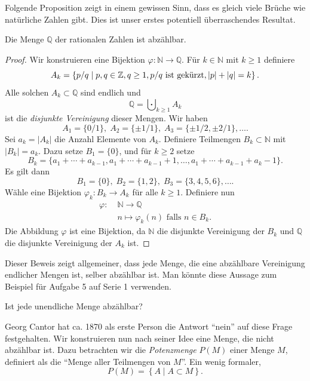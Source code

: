 \documentclass[../main.tex]{subfiles}
\begin{document}
Folgende Proposition zeigt in einem gewissen Sinn, dass es gleich viele Brüche
wie natürliche Zahlen gibt. Dies ist unser erstes potentiell überraschendes
Resultat.

\begin{manualproposition}{1}\label{prop:q-countable}
  Die Menge $\mathbb Q$ der rationalen Zahlen ist abzählbar.
\end{manualproposition}


\begin{proof}
  Wir konstruieren eine Bijektion $\varphi \colon \mathbb N \to \mathbb Q$.
  Für $k \in \mathbb N$ mit $k \geq 1$ definiere
  \[
    A_{k} = \left\{p/q \mid p, q \in \mathbb Z, q \geq 1, p/q \textup{ ist gekürzt},
    |p| + |q| = k\right\}.
  \]
  Alle solchen $A_{k} \subset \mathbb Q$ sind endlich und
  \[
    \mathbb Q = \bigcupdot_{k \geq 1} A_{k}
  \]
  ist die \textit{disjunkte Vereinigung} dieser Mengen.
  Wir haben
  \[
    A_{1} = \{0/1\}, \; A_{2} = \{\pm 1/1\}, \; A_{3} = \{\pm 1/2, \pm 2/1\}, \dots.
  \]
  Sei $a_{k} = |A_{k}|$ die Anzahl Elemente von $A_{k}$.
  Definiere Teilmengen $B_{k} \subset \mathbb N$ mit $|B_{k}| = a_{k}$.
  Dazu setze $B_{1} = \{0\}$, und für $k \geq 2$ setze
  \[
    B_{k} = \{a_{1} + \cdots + a_{k-1},
    a_{1} + \cdots + a_{k-1} + 1, \dots,
    a_{1} + \cdots + a_{k-1} + a_{k} - 1\}.
  \]
  Es gilt dann
  \[
    B_{1} = \{0\}, \; B_{2} = \{1, 2\}, \; B_{3} = \{3, 4, 5, 6\}, \dots.
  \]
Wähle eine Bijektion $\varphi_{k} \colon B_{k} \to A_{k}$ für alle $k \geq 1$.
Definiere nun
\begin{align*}
  \varphi \colon \;& \mathbb N \to \mathbb Q \\
  &n \mapsto \varphi_{k}(n) \mbox{ falls } n \in B_{k}.
\end{align*}
Die Abbildung $\varphi$ ist eine Bijektion, da $\mathbb N$ die disjunkte
Vereinigung der $B_{k}$ und $\mathbb Q$ die disjunkte Vereinigung
der $A_{k}$ ist.
\end{proof}

Dieser Beweis zeigt allgemeiner, dass jede Menge, die eine abzählbare Vereinigung
endlicher Mengen ist, selber abzählbar ist. Man könnte diese Aussage
zum Beispiel für Aufgabe 5 auf Serie 1 verwenden.

\begin{question}
  Ist jede unendliche Menge abzählbar?
\end{question}

Georg Cantor hat ca. 1870 als erste Person die Antwort ``nein'' auf diese Frage
festgehalten.
Wir konstruieren nun nach seiner Idee
eine Menge, die nicht abzählbar ist.
Dazu betrachten wir die \textit{Potenzmenge} $P(M)$
einer Menge $M$, definiert als die ``Menge aller Teilmengen von $M$''.
Ein wenig formaler,
\[P(M) = \left\{A \mid A \subset M\right\}.\]
\end{document}
